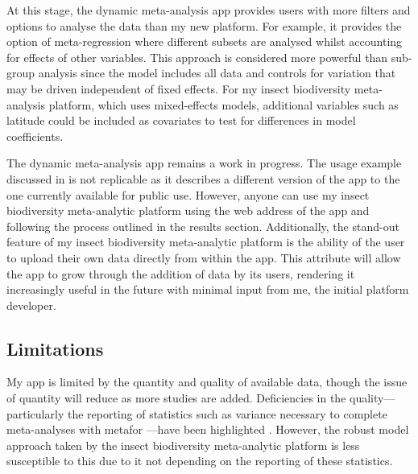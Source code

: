 \documentclass[11pt]{article}
\begin{document}
		\noindent At this stage, the dynamic meta-analysis app \citep{shackelford2021dynamic} provides users with more filters and options to analyse the data than my new platform. For example, it provides the option of meta-regression where different subsets are analysed whilst accounting for effects of other variables. This approach is considered more powerful than sub-group analysis since the model includes all data and controls for variation that may be driven independent of fixed effects. For my insect biodiversity meta-analysis platform, which uses mixed-effects models, additional variables such as latitude could be included as covariates to test for differences in model coefficients. 
		
		\noindent The dynamic meta-analysis app remains a work in progress. The usage example discussed in \citet{shackelford2021dynamic} is not replicable as it describes a different version of the app to the one currently available for public use. However, anyone can use my insect biodiversity meta-analytic platform using the web address of the app and following the process outlined in the results section. Additionally, the stand-out feature of my insect biodiversity meta-analytic platform is the ability of the user to upload their own data directly from within the app. This attribute will allow the app to grow through the addition of data by its users, rendering it increasingly useful in the future with minimal input from me, the initial platform developer. 
		
		\subsection{Limitations}
		My app is limited by the quantity and quality of available data, though the issue of quantity will reduce as more studies are added. Deficiencies in the quality—particularly the reporting of statistics such as variance necessary to complete meta-analyses with metafor \citep{viechtbauer2010conducting}—have been highlighted \citep{hedges1999meta,stewart2010meta,gurevitch2018meta}. However, the robust model approach taken by the insect biodiversity meta-analytic platform is less susceptible to this due to it not depending on the reporting of these statistics. 
		
\end{document}
